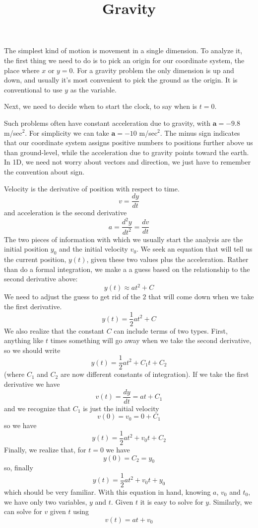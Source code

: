 \documentclass[11pt, oneside]{article}
\title{Gravity}
\date{}
\begin{document}
\maketitle
\Large


\label{sec:Falling_bodies}

The simplest kind of motion is movement in a single dimension.  To analyze it, the first thing we need to do is to pick an origin for our coordinate system, the place where $x$ or $y=0$.  For a gravity problem the only dimension is up and down, and usually it's most convenient to pick the ground as the origin.  It is conventional to use $y$ as the variable.

Next, we need to decide when to start the clock, to say when is $t=0$.

Such problems often have constant acceleration due to gravity, with $\mathbf{a}=-9.8$ m/sec$^2$.  For simplicity we can take $\mathbf{a}=-10$ m/sec$^2$.  The minus sign indicates that our coordinate system assigns positive numbers to positions further above us than ground-level, while the acceleration due to gravity points toward the earth.  In 1D, we need not worry about vectors and direction, we just have to remember the convention about sign.

Velocity is the derivative of position with respect to time.
\[ v = \frac{dy}{dt} \]
and acceleration is the second derivative
\[ a = \frac{d^2y}{dt^2} = \frac{dv}{dt} \]
The two pieces of information with which we usually start the analysis are the initial position $y_0$ and the initial velocity $v_0$.  We seek an equation that will tell us the current position, $y(t)$, given these two values plus the acceleration.  Rather than do a formal integration, we make a a guess based on the relationship to the second derivative above:
\[ y(t) \approx at^2 + C \]
We need to adjust the guess to get rid of the $2$ that will come down when we take the first derivative.
\[ y(t) = \frac{1}{2}at^2 + C \]
We also realize that the constant $C$ can include terms of two types.  First, anything like $t$ times something will go away when we take the second derivative, so we should write
\[ y(t) = \frac{1}{2}at^2 + C_1t + C_2 \]
(where $C_1$ and $C_2$ are now different constants of integration).  If we take the first derivative we have
\[ v(t) = \frac{dy}{dt} = at + C_1 \]
and we recognize that $C_1$ is just the initial velocity
\[ v(0) = v_0 = 0 + C_1 \]
so we have
\[ y(t) = \frac{1}{2}at^2 + v_0t + C_2 \]
Finally, we realize that, for $t=0$ we have
\[ y(0) = C_2 = y_0 \]
so, finally
\[ y(t) = \frac{1}{2}at^2 + v_0t + y_0 \]
which should be very familiar.  With this equation in hand, knowing $a$, $v_0$ and $t_0$, we have only two variables, $y$ and $t$.  Given $t$ it is easy to solve for $y$.  Similarly, we can solve for $v$ given $t$ using
\[ v(t) = at + v_0 \]
\end{document}
